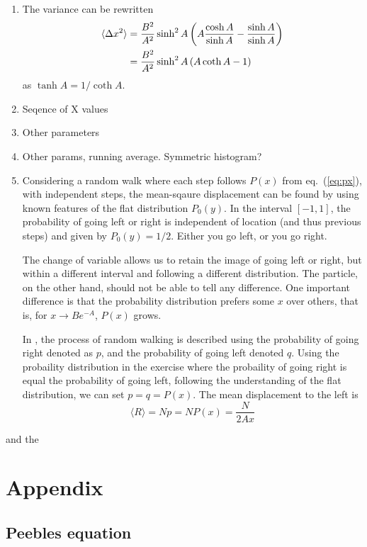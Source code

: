 \documentclass[a4paper,11pt]{article}
\begin{document}
\begin{enumerate}
    \item The variance can be rewritten
        \begin{align}
            \langle \Delta x^2 \rangle &= \frac{B^2}{A^2} \sinh^2 A \left( A \frac{\cosh A}{\sinh A} -\frac{\sinh A}{\sinh A} \right) \notag \\
            &= \frac{B^2}{A^2} \sinh^2 A \left( A \coth A - 1 \right)
            \label{eq:var_2}
        \end{align}
        as $\tanh A = 1/\coth A$. 

    \item Seqence of X values
    \item Other parameters
    \item Other params, running average. Symmetric histogram?
    \item Considering a random walk where each step follows $P(x)$ from eq.~(\ref{eq:px}), with independent steps, the mean-sqaure displacement can be found by using known features of the flat distribution $P_0(y)$. In the interval $[-1,1]$, the probability of going left or right is independent of location (and thus previous steps) and given by $P_0(y) = 1/2$. Either you go left, or you go right.

        The change of variable allows us to retain the image of going left or right, but within a different interval and following a different distribution. The particle, on the other hand, should not be able to tell any difference. One important difference is that the probability distribution prefers some $x$ over others, that is, for $x \to Be^{-A}$, $P(x)$ grows.  

        In \citet{2014Flekkoy}, the process of random walking is described using the probability of going right denoted as $p$, and the probability of going left denoted $q$. Using the probaility distribution in the exercise where the probaility of going right is equal the probability of going left, following the understanding of the flat distribution, we can set $p = q = P(x)$. The mean displacement to the left is 
        \begin{equation}
            \langle R \rangle = Np = NP(x) = \frac{N}{2Ax}
            \label{eq:average_right}
        \end{equation}
\end{enumerate}
and the 



%
%

\clearpage
\appendix
\section{Appendix}
\label{sec:appendix}

\subsection{Peebles equation}
\label{app:peebles}

%
\end{document}
